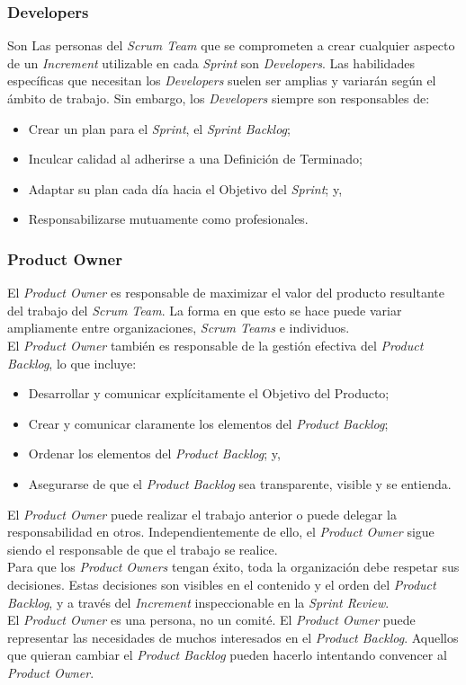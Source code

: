 \begin{spacing}{1.5}
		\subsubsection{Developers}
			Son Las personas del \textit{Scrum Team} que se comprometen a crear cualquier aspecto de un \textit{Increment} utilizable en cada \textit{Sprint} son \textit{Developers}.
			Las habilidades específicas que necesitan los \textit{Developers} suelen ser amplias y variarán según el ámbito
			de trabajo. Sin embargo, los \textit{Developers} siempre son responsables de:
			\begin{itemize}
				\item Crear un plan para el \textit{Sprint}, el \textit{Sprint Backlog};
				\item Inculcar calidad al adherirse a una Definición de Terminado;
				\item Adaptar su plan cada día hacia el Objetivo del \textit{Sprint}; y,
				\item Responsabilizarse mutuamente como profesionales.
			\end{itemize}
		\subsubsection{Product Owner}
			El \textit{Product Owner} es responsable de maximizar el valor del producto resultante del trabajo del \textit{Scrum Team}. La forma en que esto se hace puede variar ampliamente entre organizaciones, \textit{Scrum Teams} e individuos.\\
			El \textit{Product Owner} también es responsable de la gestión efectiva del \textit{Product Backlog}, lo que incluye:
			\begin{itemize}
				\item Desarrollar y comunicar explícitamente el Objetivo del Producto;
				\item Crear y comunicar claramente los elementos del \textit{Product Backlog};
				\item Ordenar los elementos del \textit{Product Backlog}; y,
				\item Asegurarse de que el \textit{Product Backlog} sea transparente, visible y se entienda.
			\end{itemize}
			El \textit{Product Owner} puede realizar el trabajo anterior o puede delegar la responsabilidad en otros. Independientemente de ello, el \textit{Product Owner} sigue siendo el responsable de que el trabajo se realice.\\
			Para que los \textit{Product Owners} tengan éxito, toda la organización debe respetar sus decisiones. Estas decisiones son visibles en el contenido y el orden del \textit{Product Backlog}, y a través del \textit{Increment} inspeccionable en la \textit{Sprint Review}.\\
			El \textit{Product Owner} es una persona, no un comité. El \textit{Product Owner} puede representar las necesidades de muchos interesados en el \textit{Product Backlog}. Aquellos que quieran cambiar el \textit{Product Backlog} pueden hacerlo intentando convencer al \textit{Product Owner}.

\end{spacing}
